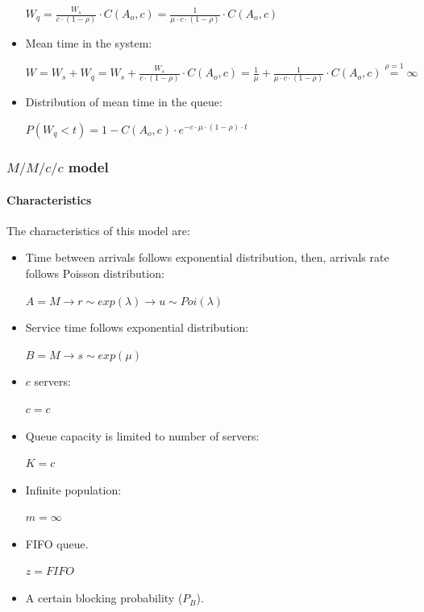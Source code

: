 \documentclass[
	12pt,
	twoside
]{book}
\begin{document}
\begin{itemize}
{		$
			W_q =
			\frac {W_s} {c \cdot (1-\rho)} \cdot C(A_o, c) =
			\frac {1} {\mu \cdot c \cdot (1-\rho)} \cdot C(A_o, c)
		$
	}
	\item {
		Mean time in the system:

		$
			W =
			W_s + W_q =
			W_s + \frac {W_s} {c \cdot (1-\rho)} \cdot C(A_o, c) =
			\frac {1} {\mu} + \frac {1} {\mu \cdot c \cdot (1-\rho)} \cdot C(A_o, c)
			\overset {\rho=1} {=} \infty
		$
	}
	\item {
		Distribution of mean time in the queue:

		$
			P(W_q < t) = 1 - C(A_o, c) \cdot e^{- c \cdot \mu \cdot (1-\rho) \cdot t}
		$
	}
\end{itemize}

\subsubsection{$M/M/c/c$ model}

\paragraph{Characteristics}

The characteristics of this model are:

\begin{itemize}
	\item {
		Time between arrivals follows exponential distribution, then, arrivals rate follows Poisson distribution:

		$
			A = M \rightarrow r \sim exp(\lambda) \rightarrow u \sim Poi(\lambda)
		$
	}
	\item {
		Service time follows exponential distribution:

		$
			B = M \rightarrow s \sim exp(\mu)
		$
	}
	\item {
		$c$ servers:

		$
			c = c
		$
	}
	\item {
		Queue capacity is limited to number of servers:

		$
			K = c
		$
	}
	\item {
		Infinite population:

		$
			m = \infty
		$
	}
	\item {
		FIFO queue.

		$
			z = FIFO
		$
	}
	\item A certain blocking probability ($P_B$).
\end{itemize}
\end{document}
